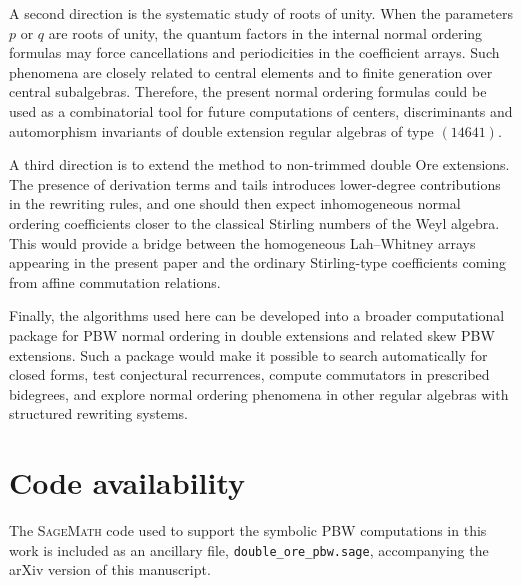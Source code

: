 \documentclass{amsart}
\theoremstyle{definition}
\theoremstyle{remark}
\numberwithin{equation}{section}
\begin{document}
A second direction is the systematic study of roots of unity. When the parameters $p$ or $q$ are roots of unity, the quantum factors in the internal normal ordering formulas may force cancellations and periodicities in the coefficient arrays. Such phenomena are closely related to central elements and to finite generation over central subalgebras. Therefore, the present normal ordering formulas could be used as a combinatorial tool for future computations of centers, discriminants and automorphism invariants of double extension regular algebras of type $(14641)$.

A third direction is to extend the method to non-trimmed double Ore extensions. The presence of derivation terms and tails introduces lower-degree contributions in the rewriting rules, and one should then expect inhomogeneous normal ordering coefficients closer to the classical Stirling numbers of the Weyl algebra. This would provide a bridge between the homogeneous Lah--Whitney arrays appearing in the present paper and the ordinary Stirling-type coefficients coming from affine commutation relations.

Finally, the algorithms used here can be developed into a broader computational package for PBW normal ordering in double extensions and related skew PBW extensions. Such a package would make it possible to search automatically for closed forms, test conjectural recurrences, compute commutators in prescribed bidegrees, and explore normal ordering phenomena in other regular algebras with structured rewriting systems.
\section*{Code availability}

The \textsc{SageMath} code used to support the symbolic PBW computations in this work is included as an ancillary file, \texttt{double\_ore\_pbw.sage}, accompanying the arXiv version of this manuscript.
\end{document}
